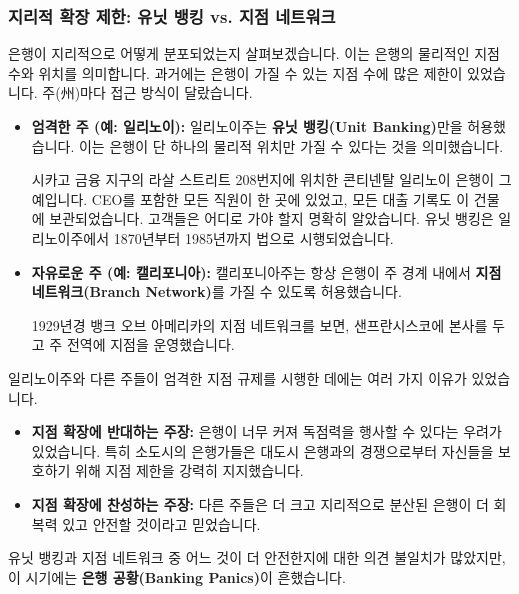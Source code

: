 \documentclass[11pt,a4paper]{book}
\theoremstyle{definition}
\begin{document}
\subsubsection*{지리적 확장 제한: 유닛 뱅킹 vs. 지점 네트워크}
은행이 지리적으로 어떻게 분포되었는지 살펴보겠습니다. 이는 은행의 물리적인 지점 수와 위치를 의미합니다. 과거에는 은행이 가질 수 있는 지점 수에 많은 제한이 있었습니다. 주(州)마다 접근 방식이 달랐습니다.

\begin{itemize}
    \item \textbf{엄격한 주 (예: 일리노이):} 일리노이주는 \textbf{유닛 뱅킹(Unit Banking)}만을 허용했습니다. 이는 은행이 단 하나의 물리적 위치만 가질 수 있다는 것을 의미했습니다.
    \begin{examplebox}[title={콘티넨탈 일리노이 은행 (Continental Illinois Bank)}]
    시카고 금융 지구의 라살 스트리트 208번지에 위치한 콘티넨탈 일리노이 은행이 그 예입니다. CEO를 포함한 모든 직원이 한 곳에 있었고, 모든 대출 기록도 이 건물에 보관되었습니다. 고객들은 어디로 가야 할지 명확히 알았습니다. 유닛 뱅킹은 일리노이주에서 1870년부터 1985년까지 법으로 시행되었습니다.
    \end{examplebox}
    \item \textbf{자유로운 주 (예: 캘리포니아):} 캘리포니아주는 항상 은행이 주 경계 내에서 \textbf{지점 네트워크(Branch Network)}를 가질 수 있도록 허용했습니다.
    \begin{examplebox}[title={뱅크 오브 아메리카 (Bank of America) 지점 네트워크 (1929년경)}]
    1929년경 뱅크 오브 아메리카의 지점 네트워크를 보면, 샌프란시스코에 본사를 두고 주 전역에 지점을 운영했습니다.
    \end{examplebox}
\end{itemize}

일리노이주와 다른 주들이 엄격한 지점 규제를 시행한 데에는 여러 가지 이유가 있었습니다.
\begin{itemize}
    \item \textbf{지점 확장에 반대하는 주장:} 은행이 너무 커져 독점력을 행사할 수 있다는 우려가 있었습니다. 특히 소도시의 은행가들은 대도시 은행과의 경쟁으로부터 자신들을 보호하기 위해 지점 제한을 강력히 지지했습니다.
    \item \textbf{지점 확장에 찬성하는 주장:} 다른 주들은 더 크고 지리적으로 분산된 은행이 더 회복력 있고 안전할 것이라고 믿었습니다.
\end{itemize}
유닛 뱅킹과 지점 네트워크 중 어느 것이 더 안전한지에 대한 의견 불일치가 많았지만, 이 시기에는 \textbf{은행 공황(Banking Panics)}이 흔했습니다.
\end{document}
